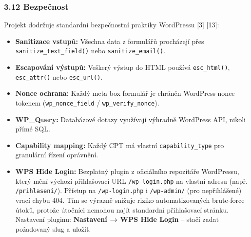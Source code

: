 \begin{Shaded}
\begin{Highlighting}[]
\NormalTok{) \{}
     \NormalTok{(}\OtherTok{,} \OtherTok{,} \NormalTok{)}\OtherTok{;}
\NormalTok{\}}
\OtherTok{,} \NormalTok{)}\OtherTok{;}
\OtherTok{,} \NormalTok{)}\OtherTok{;}
\end{Highlighting}
\end{Shaded}

\subsubsection{3.12 Bezpečnost}\label{bezpeux10dnost}

Projekt dodržuje standardní bezpečnostní praktiky WordPressu {[}3{]}
{[}13{]}:

\begin{itemize}
\tightlist
\item
  \textbf{Sanitizace vstupů:} Všechna data z formulářů procházejí přes
  \texttt{sanitize\_text\_field()} nebo \texttt{sanitize\_email()}.
\item
  \textbf{Escapování výstupů:} Veškerý výstup do HTML používá
  \texttt{esc\_html()}, \texttt{esc\_attr()} nebo \texttt{esc\_url()}.
\item
  \textbf{Nonce ochrana:} Každý meta box formulář je chráněn WordPress
  nonce tokenem (\texttt{wp\_nonce\_field} /
  \texttt{wp\_verify\_nonce}).
\item
  \textbf{WP\_Query:} Databázové dotazy využívají výhradně WordPress
  API, nikoli přímé SQL.
\item
  \textbf{Capability mapping:} Každý CPT má vlastní
  \texttt{capability\_type} pro granulární řízení oprávnění.
\item
  \textbf{WPS Hide Login:} Bezplatný plugin z oficiálního repozitáře
  WordPressu, který mění výchozí přihlašovací URL \texttt{/wp-login.php}
  na vlastní adresu (např. \texttt{/prihlaseni/}). Přístup na
  \texttt{/wp-login.php} i \texttt{/wp-admin/} (pro nepřihlášené) vrací
  chybu 404. Tím se výrazně snižuje riziko automatizovaných brute-force
  útoků, protože útočníci nemohou najít standardní přihlašovací stránku.
  Nastavení pluginu: \textbf{Nastavení → WPS Hide Login} -- stačí zadat
  požadovaný slug a uložit.
\end{itemize}

